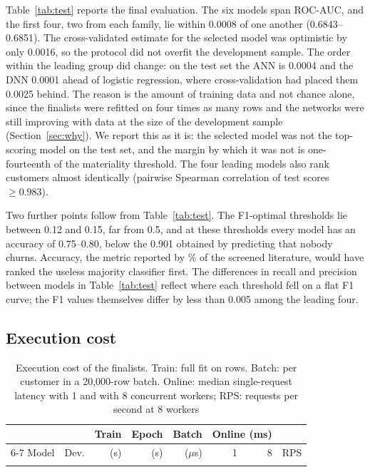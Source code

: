 \documentclass[conference]{IEEEtran}
\begin{document}
Table~\ref{tab:test} reports the final evaluation. The six models span \TestSpread{} ROC-AUC, and the first four, two from each family, lie within 0.0008 of one another (0.6843--0.6851). The cross-validated estimate for the selected model was optimistic by only 0.0016, so the protocol did not overfit the development sample. The order within the leading group did change: on the test set the ANN is 0.0004 and the DNN 0.0001 ahead of logistic regression, where cross-validation had placed them 0.0025 behind. The reason is the amount of training data and not chance alone, since the finalists were refitted on four times as many rows and the networks were still improving with data at the size of the development sample (Section~\ref{sec:why}). We report this as it is: the selected model was not the top-scoring model on the test set, and the margin by which it was not is one-fourteenth of the materiality threshold. The four leading models also rank customers almost identically (pairwise Spearman correlation of test scores $\geq0.983$).

Two further points follow from Table~\ref{tab:test}. The F1-optimal thresholds lie between 0.12 and 0.15, far from 0.5, and at these thresholds every model has an accuracy of 0.75--0.80, below the 0.901 obtained by predicting that nobody churns. Accuracy, the metric reported by \LitAllAcc\% of the screened literature, would have ranked the useless majority classifier first. The differences in recall and precision between models in Table~\ref{tab:test} reflect where each threshold fell on a flat F1 curve; the F1 values themselves differ by less than 0.005 among the leading four.

\subsection{Execution cost}
\begin{table}[t]
\caption{Execution cost of the finalists. Train: full fit on \NTrain{} rows. Batch: per customer in a 20,000-row batch. Online: median single-request latency with 1 and with 8 concurrent workers; RPS: requests per second at 8 workers}
\label{tab:runtime}
\centering
\footnotesize
\setlength{\tabcolsep}{3pt}
\begin{tabular}{@{}llrrrrrr@{}}
\toprule
 & & Train & Epoch & Batch & \multicolumn{2}{c}{Online (ms)} & \\
\cmidrule(lr){6-7}
Model & Dev. & (s) & (s) & ($\mu$s) & 1 & 8 & RPS \\
\midrule
\\
\bottomrule
\end{tabular}
\end{table}
\end{document}
